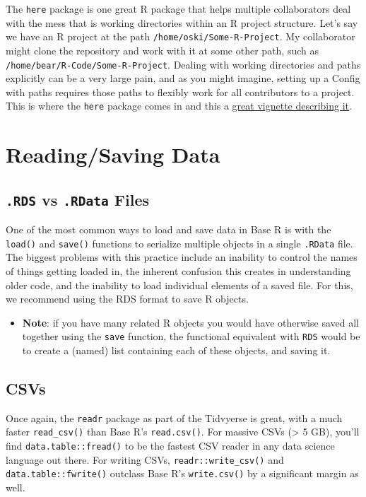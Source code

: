 \documentclass[
]{book}
\providecommand{\tightlist}{%
  \setlength{\itemsep}{0pt}\setlength{\parskip}{0pt}}
\begin{document}
The \texttt{here} package is one great R package that helps multiple collaborators deal with the mess that is working directories within an R project structure. Let's say we have an R project at the path \texttt{/home/oski/Some-R-Project}. My collaborator might clone the repository and work with it at some other path, such as \texttt{/home/bear/R-Code/Some-R-Project}. Dealing with working directories and paths explicitly can be a very large pain, and as you might imagine, setting up a Config with paths requires those paths to flexibly work for all contributors to a project. This is where the \texttt{here} package comes in and this a \href{https://github.com/jennybc/here_here}{great vignette describing it}.

\section{Reading/Saving Data}\label{readingsaving-data}

\subsection{\texorpdfstring{\texttt{.RDS} vs \texttt{.RData} Files}{.RDS vs .RData Files}}\label{rds-vs-.rdata-files}

One of the most common ways to load and save data in Base R is with the \texttt{load()} and \texttt{save()} functions to serialize multiple objects in a single \texttt{.RData} file. The biggest problems with this practice include an inability to control the names of things getting loaded in, the inherent confusion this creates in understanding older code, and the inability to load individual elements of a saved file. For this, we recommend using the RDS format to save R objects.

\begin{itemize}
\tightlist
\item
  \textbf{Note}: if you have many related R objects you would have otherwise saved all together using the \texttt{save} function, the functional equivalent with \texttt{RDS} would be to create a (named) list containing each of these objects, and saving it.
\end{itemize}

\subsection{CSVs}\label{csvs}

Once again, the \texttt{readr} package as part of the Tidvyerse is great, with a much faster \texttt{read\_csv()} than Base R's \texttt{read.csv()}. For massive CSVs (\textgreater{} 5 GB), you'll find \texttt{data.table::fread()} to be the fastest CSV reader in any data science language out there. For writing CSVs, \texttt{readr::write\_csv()} and \texttt{data.table::fwrite()} outclass Base R's \texttt{write.csv()} by a significant margin as well.
\end{document}
